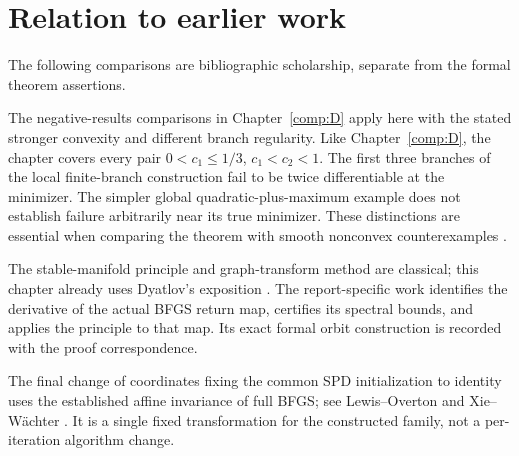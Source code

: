 \endgroup


\section*{Relation to earlier work}
The following comparisons are bibliographic scholarship, separate from the formal theorem assertions.

The negative-results comparisons in Chapter~\ref{comp:D} apply here with the stated stronger convexity and different branch regularity. Like Chapter~\ref{comp:D}, the chapter covers every pair $0<c_1\le1/3$, $c_1<c_2<1$. The first three branches of the local finite-branch construction fail to be twice differentiable at the minimizer. The simpler global quadratic-plus-maximum example does not establish failure arbitrarily near its true minimizer. These distinctions are essential when comparing the theorem with smooth nonconvex counterexamples \cite{NEG_M07,NEG_M14,NEG_DIAO26}.

The stable-manifold principle and graph-transform method are classical; this chapter already uses Dyatlov's exposition \cite[Sections 3--4]{DY}. The report-specific work identifies the derivative of the actual BFGS return map, certifies its spectral bounds, and applies the principle to that map. Its exact formal orbit construction is recorded with the proof correspondence.

The final change of coordinates fixing the common SPD initialization to identity uses the established affine invariance of full BFGS; see Lewis--Overton \cite[Section 2]{LO} and Xie--W\"achter \cite[Theorem II.1]{XW}. It is a single fixed transformation for the constructed family, not a per-iteration algorithm change.
